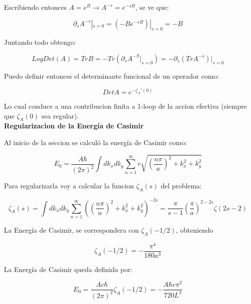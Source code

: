 Escribiendo entonces $A= e ^{B} \rightarrow A ^{-s} = e ^{-s B}$, se ve que:

\begin{equation}
\partial _s A ^{-s} | _{s=0} = (- B e ^{-s B}) | _{s=0} = - B
\end{equation}

Juntando todo obtengo:

\begin{equation}
Log Det ( A ) = Tr B = - Tr  \left( \partial _s A ^{-S} | _{s=0} \right) =
 - \partial _s \left( Tr A ^{-s} \right) | _{s=0}
\end{equation}

Puedo definir entonces el determinante funcional de un operador como:

\begin{equation}
Det A = e ^{- \zeta _A ' (0)}
\end{equation}

Lo cual conduce a una contribucion finita a 1-loop de la accion efectiva (siempre que $\zeta _A (0)$ sea regular). \\

\textbf{Regularizacion de la Energía de Casimir}

Al inicio de la seccion se calculó la energía de Casimir como:

\begin{equation}
E _0 = \frac{A \hbar }{(2 \pi) ^2} \int dk _x dk _y 
\sum _{n=1} ^{\infty} 
c
\sqrt{
		\left( \frac{n \pi}{a } \right) ^2 + k _x ^2 + k _y ^2
		}
\end{equation}

Para regularizarla voy a calcular la funcion $\zeta _A (s)$ del problema:

\begin{equation}
\zeta _A (s) = 
\int dk _x dk _y 
\sum _{n=1} ^{\infty} 
\left(	\left( \frac{n \pi}{a } \right) ^2 + k _x ^2 + k _y ^2
		\right) ^{-2s} = 
\frac{\pi}{s-1} \left( \frac{\pi}{a} \right) ^{2-2s} \zeta (2s-2)
\end{equation}

La Energía de Casimir, se correspondera con $\zeta _A (-1/2)$, obteniendo 


\begin{equation}
\zeta _A (-1/2) = 
- \frac{\pi ^4}{180 a ^3}
\end{equation}

La Energía de Casimir queda definida por:

\begin{equation}
E _0 =  \frac{A c \hbar}{(2 \pi) ^2}
\zeta _A (-1/2) =
- \frac{A \hbar c \pi ^2}
		{720 L ^3}
\end{equation}

